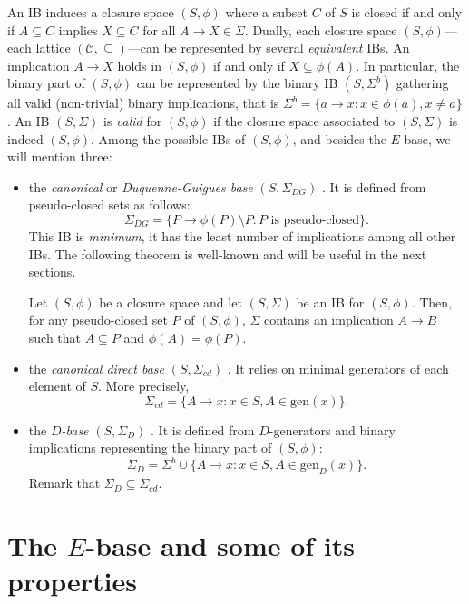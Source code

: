 \documentclass[12pt, a4paper]{article}
\newcommand{\cc}[1]{\mathcal{#1}}  %
\newcommand{\mtt}[2]{\texorpdfstring{#1}{#2}}  %
\newcommand{\st}{:}  %
\newcommand{\U}{S}  %
\newcommand{\cl}{\phi}  %
\newcommand{\cs}{\cc{C}} %
\newcommand{\gen}{\mathrm{gen}}  %
\newcommand{\imp}{\rightarrow}  %
\newcommand{\is}{\Sigma}  %
\begin{document}
An IB induces a closure space $(\U, \cl)$ where a subset $C$ of $\U$ is closed if and only if $A \subseteq C$ implies $X \subseteq C$ for all $A \imp X \in \is$.
Dually, each closure space $(\U, \cl)$---each lattice $(\cs, \subseteq)$---can be represented by several \emph{equivalent} IBs.
An implication $A \imp X$ holds in $(\U, \cl)$ if and only if $X \subseteq \cl(A)$.
In particular, the binary part of $(\U, \cl)$ can be represented by the binary IB $(\U, \is^b)$ gathering all valid (non-trivial) binary implications, that is $\is^b = \{a \imp x \st x \in \cl(a), x \neq a\}$.
An IB $(\U, \is)$ is \emph{valid} for $(\U, \cl)$ if the closure space associated to $(\U, \is)$ is indeed $(\U, \cl)$.
Among the possible IBs of $(\U, \cl)$, and besides the $E$-base, we will mention three:
\begin{itemize}
\item the \emph{canonical} or \emph{Duquenne-Guigues base} $(\U, \is_{DG})$ \cite{guigues1986familles}.
It is defined from pseudo-closed sets as follows: 
%
\[ \is_{DG} = \{P \imp \cl(P) \setminus P \st P \text{ is pseudo-closed}\}. \]
This IB is \emph{minimum}, it has the least number of implications among all other IBs.
The following theorem is well-known and will be useful in the next sections.
%
\begin{theorem} \label{thm:canonical}
Let $(\U, \cl)$ be a closure space and let $(\U, \is)$ be an IB for $(\U, \cl)$. 
Then, for any pseudo-closed set $P$ of $(\U, \cl)$, $\is$ contains an implication $A \imp B$ such that $A \subseteq P$ and $\cl(A) = \cl(P)$.
\end{theorem}

\item the \emph{canonical direct base} $(\U, \is_{cd})$ \cite{bertet2010multiple}.
It relies on minimal generators of each element of $\U$.
More precisely, 
%
\[ \is_{cd} = \{A \imp x \st x \in \U, A \in \gen(x)\}.\]

\item the \emph{$D$-base} $(\U, \is_D)$ \cite{adaricheva2013ordered}.
It is defined from $D$-generators and binary implications representing the binary part of $(\U, \cl)$: 
%
\[ \is_D = \is^b \cup \{A \imp x \st x \in \U, A \in \gen_D(x)\}. \]
%
Remark that $\is_D \subseteq \is_{cd}$.
\end{itemize}

\section{The \mtt{$E$}{E}-base and some of its properties} \label{sec:E-base}
\end{document}
